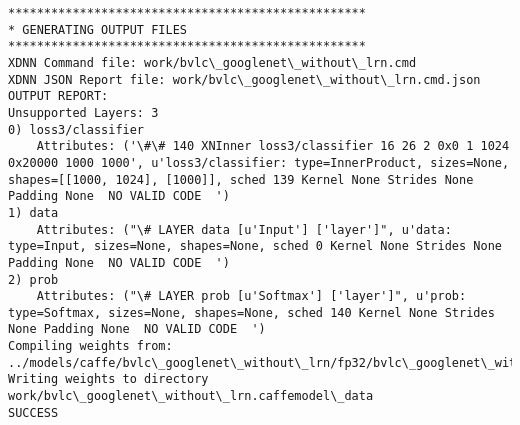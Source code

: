 \documentclass[11pt]{article}
\begin{document}
\begin{Verbatim}[commandchars=\\\{\}]
**************************************************
* GENERATING OUTPUT FILES
**************************************************
XDNN Command file: work/bvlc\_googlenet\_without\_lrn.cmd
XDNN JSON Report file: work/bvlc\_googlenet\_without\_lrn.cmd.json
OUTPUT REPORT:
Unsupported Layers: 3
0) loss3/classifier
	Attributes: ('\#\# 140 XNInner loss3/classifier 16 26 2 0x0 1 1024 0x20000 1000 1000', u'loss3/classifier: type=InnerProduct, sizes=None, shapes=[[1000, 1024], [1000]], sched 139 Kernel None Strides None Padding None  NO VALID CODE  ')
1) data
	Attributes: ("\# LAYER data [u'Input'] ['layer']", u'data: type=Input, sizes=None, shapes=None, sched 0 Kernel None Strides None Padding None  NO VALID CODE  ')
2) prob
	Attributes: ("\# LAYER prob [u'Softmax'] ['layer']", u'prob: type=Softmax, sizes=None, shapes=None, sched 140 Kernel None Strides None Padding None  NO VALID CODE  ')
Compiling weights from: ../models/caffe/bvlc\_googlenet\_without\_lrn/fp32/bvlc\_googlenet\_without\_lrn.caffemodel
Writing weights to directory work/bvlc\_googlenet\_without\_lrn.caffemodel\_data
SUCCESS


\end{Verbatim}
\end{document}

